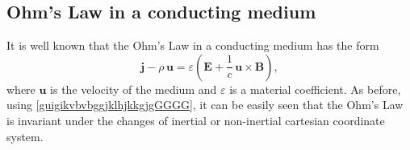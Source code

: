 \documentclass{article}
\theoremstyle{definition}
\theoremstyle{remark}
\renewcommand{\vec}[1]{\mathbf{#1}}
\newcommand{\er}{\eqref}
\newcommand{\er}{\eqref}
\begin{document}
\subsection{Ohm's Law in a conducting medium} It is well known that
the Ohm's Law in a conducting medium has the form
\begin{equation}\label{vjhfhjtjhjhuyyiyGG}
\vec j-\rho\,\vec u=\varepsilon\left(\vec E+\frac{1}{c}\,\vec
u\times \vec B\right),
\end{equation}
where $\vec u$ is the velocity of the medium and $\varepsilon$ is a
material coefficient. As before, using
\er{guigikvbvbggjklhjkkgjgGGGG}, it can be easily seen that the
Ohm's Law is invariant under the changes of inertial or non-inertial
cartesian coordinate system.
\end{document}
